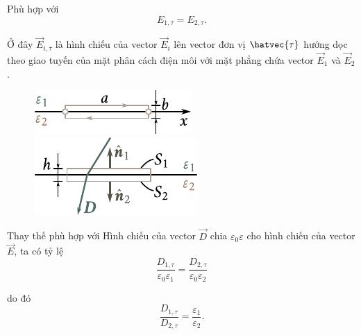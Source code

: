 \noindent
Phù hợp với 
\begin{equation}\label{eq:2_44}
    E_{1,\tau} = E_{2,\tau}.
\end{equation}

\noindent
Ở đây $\vec{E}_{i,\tau}$ là hình chiếu của vector $\vec{E}_i$ lên vector đơn vị $\hatvec{\tau}$ hướng dọc theo giao tuyến của mặt phân cách điện môi với mặt phẳng chứa vector $\vec{E}_1$ và $\vec{E}_2$.

\begin{figure}[!htb]
	\begin{minipage}[t]{0.48\linewidth}
		\begin{center}
			\includegraphics[scale=1.0]{figures/ch_02/fig_2_9.pdf}
			\caption[]{}
			\label{fig:2_9}
		\end{center}
	\end{minipage}
	\hfill{}%
	\begin{minipage}[t]{0.48\linewidth}
		\begin{center}
			\includegraphics[scale=1.0]{figures/ch_02/fig_2_10.pdf}
			\caption[]{}
			\label{fig:2_10}
		\end{center}
	\end{minipage}
\vspace{-0.4cm}
\end{figure}

Thay thế phù hợp với  Hình chiếu của vector $\vec{D}$ chia $\varepsilon_0\varepsilon$ cho hình chiếu của vector $\vec{E}$, ta có tỷ lệ
\begin{equation*}
    \frac{D_{1,\tau}}{\varepsilon_0\varepsilon_1} = \frac{D_{2,\tau}}{\varepsilon_0\varepsilon_2}
\end{equation*}

\noindent
do đó
\begin{equation}\label{eq:2_45}
    \frac{D_{1,\tau}}{D_{2,\tau}} = \frac{\varepsilon_1}{\varepsilon_2}.
\end{equation}

